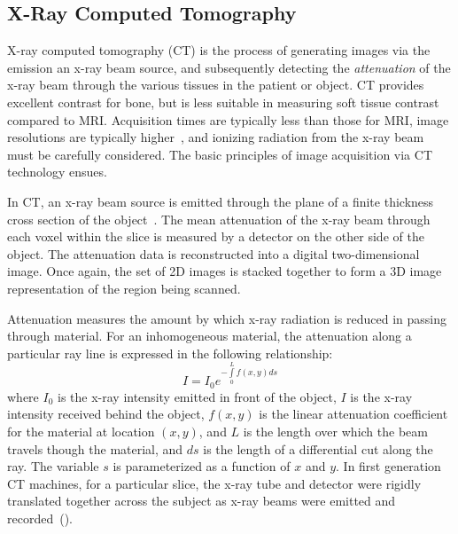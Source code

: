\subsection{X-Ray Computed Tomography}
\label{X-Ray Computed Tomography}

X-ray computed tomography (CT) is the process of generating images via the emission an x-ray beam source, and subsequently detecting the \textit{attenuation} of the x-ray beam through the various tissues in the patient or object. CT provides excellent contrast for bone, but is less suitable in measuring soft tissue contrast compared to MRI. Acquisition times are typically less than those for MRI, image resolutions are typically higher~\cite{pomeranz_2007}, and ionizing radiation from the x-ray beam must be carefully considered. The basic principles of image acquisition via CT technology ensues.

In CT, an x-ray beam source is emitted through the plane of a finite thickness cross section of the object~\cite{mahesh_2002}. The mean attenuation of the x-ray beam through each voxel within the slice is measured by a detector on the other side of the object. The attenuation data is reconstructed into a digital two-dimensional image. Once again, the set of 2D images is stacked together to form a 3D image representation of the region being scanned.

Attenuation measures the amount by which x-ray radiation is reduced in passing through material. For an inhomogeneous material, the attenuation along a particular ray line is expressed in the following relationship:
\begin{equation}
I= I_0e^{-\int\limits_{0}^{L}f(x,y) ds}
\label{eqn:init}
\end{equation}
where $I_0$ is the x-ray intensity emitted in front of the object, $I$ is the x-ray intensity received behind the object, $f(x,y)$ is the linear attenuation coefficient for the material at location $(x,y)$, and $L$ is the length over which the beam travels though the material, and $ds$ is the length of a differential cut along the ray. The variable $s$ is parameterized as a function of $x$ and $y$. In first generation CT machines, for a particular slice, the x-ray tube and detector were rigidly translated together across the subject as x-ray beams were emitted and recorded~().

